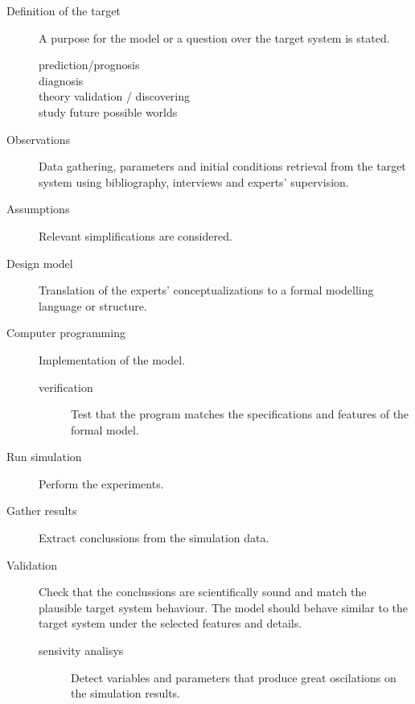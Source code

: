 \documentclass[11pt,oneside,a4paper,openright]{report}
\begin{document}
\begin{description}
\renewcommand{\labelitemi}{$\bullet$}
\renewcommand{\labelitemii}{$\cdot$}
\item [Definition of the target] A purpose for the model or a question over the target system is stated.
	\begin{description}
	\item [prediction/prognosis]
	\item [diagnosis]
	\item [theory validation / discovering]
	\item [study future possible worlds]
	\end{description}
\item [Observations] Data gathering, parameters and initial conditions retrieval from the target system using bibliography, interviews and experts' supervision.
\item [Assumptions] Relevant simplifications are considered. 
\item [Design model] Translation of the experts' conceptualizations to a formal modelling language or structure. 
\item [Computer programming] Implementation of the model.
	\begin{description}
	\item [verification] Test that the program matches the specifications and features of the formal model.
	\end{description}
\item [Run simulation] Perform the experiments.
\item [Gather results] Extract conclussions from the simulation data. 
\item [Validation] Check that the conclussions are scientifically sound and match the plausible target system behaviour. The model should behave similar to the target system under the selected features and details.
	\begin{description}
	\item [sensivity analisys] Detect variables and parameters that produce great oscilations on the simulation results.
	\end{description}
\end{description}
\end{document}
